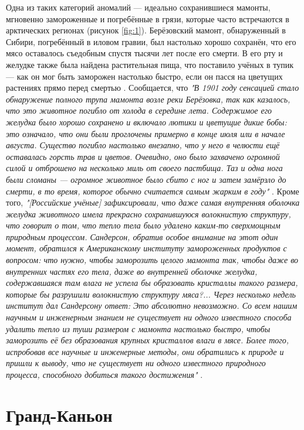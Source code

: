 \documentclass[10pt,twocolumn,letterpaper]{article}
\begin{document}
Одна из таких категорий аномалий — идеально сохранившиеся мамонты, мгновенно замороженные и погребённые в грязи, которые часто встречаются в арктических регионах (рисунок \ref{fig:1}). Берёзовский мамонт, обнаруженный в Сибири, погребённый в иловом гравии, был настолько хорошо сохранён, что его мясо оставалось съедобным спустя тысячи лет после его смерти. В его рту и желудке также была найдена растительная пища, что поставило учёных в тупик — как он мог быть заморожен настолько быстро, если он пасся на цветущих растениях прямо перед смертью \cite{17}. Сообщается, что \textit{"В 1901 году сенсацией стало обнаружение полного трупа мамонта возле реки Берёзовка, так как казалось, что это животное погибло от холода в середине лета. Содержимое его желудка было хорошо сохранено и включало лютики и цветущие дикие бобы: это означало, что они были проглочены примерно в конце июля или в начале августа. Существо погибло настолько внезапно, что у него в челюсти ещё оставалась горсть трав и цветов. Очевидно, оно было захвачено огромной силой и отброшено на несколько миль от своего пастбища. Таз и одна нога были сломаны — огромное животное было сбито с ног и затем замёрзло до смерти, в то время, которое обычно считается самым жарким в году"} \cite{18}. Кроме того, \textit{"[Российские учёные] зафиксировали, что даже самая внутренняя оболочка желудка животного имела прекрасно сохранившуюся волокнистую структуру, что говорит о том, что тепло тела было удалено каким-то сверхмощным природным процессом. Сандерсон, обратив особое внимание на этот один момент, обратился к Американскому институту замороженных продуктов с вопросом: что нужно, чтобы заморозить целого мамонта так, чтобы даже во внутренних частях его тела, даже во внутренней оболочке желудка, содержавшаяся там влага не успела бы образовать кристаллы такого размера, которые бы разрушили волокнистую структуру мяса?... Через несколько недель институт дал Сандерсону ответ: Это абсолютно невозможно. Со всем нашим научным и инженерным знанием не существует ни одного известного способа удалить тепло из туши размером с мамонта настолько быстро, чтобы заморозить её без образования крупных кристаллов влаги в мясе. Более того, испробовав все научные и инженерные методы, они обратились к природе и пришли к выводу, что не существует ни одного известного природного процесса, способного добиться такого достижения"} \cite{19}.

\section{Гранд-Каньон}
\end{document}
